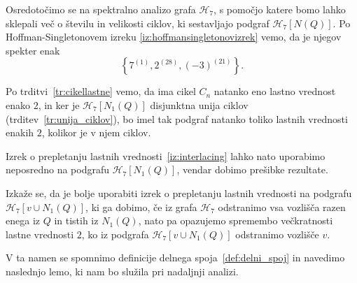 \documentclass[fin1, tisk]{fmfdelo}
\newcommand{\hof}{\mathscr{H}_{7}}
\begin{document}
\begin{opomba}\label{op:moore_spekter}
Osredotočimo se na spektralno analizo grafa $\hof$, s pomočjo katere bomo 
lahko sklepali več o številu in velikosti ciklov, ki sestavljajo podgraf $\hof[N(Q)]$. 
Po Hoffman-Singletonovem izreku 
\ref{iz:hoffmansingletonovizrek} vemo, da je njegov spekter 
enak $$\left\{7^{(1)}, 2^{(28)}, (-3)^{(21)}\right\}.$$
\end{opomba}


\begin{opomba}
Po trditvi~\ref{tr:cikellastne} vemo, da ima cikel $C_n$ natanko eno lastno vrednost enako $2$, 
in ker je $\hof[N_1(Q)]$ disjunktna unija ciklov (trditev~\ref{tr:unija_ciklov}), bo imel tak podgraf natanko toliko 
lastnih vrednosti enakih $2$, kolikor je v njem ciklov.

Izrek o prepletanju lastnih vrednosti~\ref{iz:interlacing} lahko nato uporabimo
neposredno na podgrafu $\hof[N_1(Q)]$, vendar dobimo prešibke rezultate.

Izkaže se, da je bolje uporabiti izrek o prepletanju lastnih vrednosti na 
podgrafu $\hof[v \cup N_1(Q)]$, ki ga dobimo, če iz grafa $\hof$ odstranimo vsa vozlišča
razen enega iz $Q$ in tistih iz $N_1(Q)$, nato pa opazujemo spremembo večkratnosti
lastne vrednosti $2$, ko iz podgrafa $\hof[v \cup N_1(Q)]$ odstranimo vozlišče $v$.

V ta namen se spomnimo definicije delnega spoja~\ref{def:delni_spoj} in navedimo naslednjo lemo, 
ki nam bo služila pri nadaljnji analizi.
\end{opomba}
\end{document}
